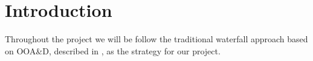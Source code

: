 \chapter{Introduction}

Throughout the project we will be follow the traditional waterfall approach based on OOA\&D, described in \cite{mathiassen2001objektorienteret}, as the strategy for our project.
